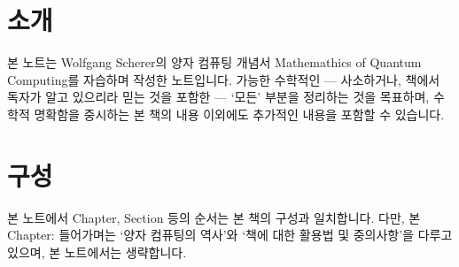 \documentclass[./note.tex]{subfiles}
\begin{document}
\section{소개}
본 노트는 Wolfgang Scherer의 양자 컴퓨팅 개념서 Mathemathics of Quantum Computing\cite{Scherer_2020}를 자습하며 작성한 노트입니다. 가능한 수학적인 --- 사소하거나, 책에서 독자가 알고 있으리라 믿는 것을 포함한 --- `모든' 부분을 정리하는 것을 목표하며, 수학적 명확함을 중시하는 본 책의 내용 이외에도 추가적인 내용을 포함할 수 있습니다.

\section{구성}
본 노트에서 Chapter, Section 등의 순서는 본 책의 구성과 일치합니다. 다만, 본 Chapter: 들어가며는 `양자 컴퓨팅의 역사'와 `책에 대한 활용법 및 중의사항'을 다루고 있으며, 본 노트에서는 생략합니다.
\end{document}
